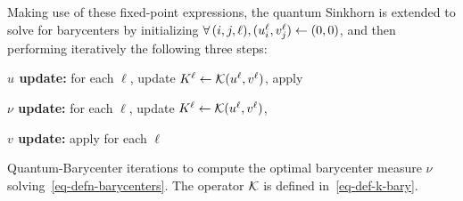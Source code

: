 Making use of these fixed-point expressions, the quantum Sinkhorn is extended to solve for barycenters by initializing $\forall \, (i,j,\ell), (u_i^\ell,v_j^\ell) \leftarrow (0,0)$, and then performing iteratively the following three steps:
\begin{rs}
	\item \textbf{$u$ update:}  for each $\ell$, update $K^\ell \leftarrow \mathcal{K}(u^\ell,v^\ell)$, apply
	\item \textbf{$\nu$ update:} for each $\ell$, update $K^\ell \leftarrow \mathcal{K}(u^\ell,v^\ell)$, 
	\item \textbf{$v$ update:} apply for each $\ell$
\end{rs}
\fi

\begin{algorithm}[t]
\fbox{\hspace{-.1in}\parbox{\columnwidth}{%
\begin{algorithmic}
\Function{Quantum-Barycenter}{$(\mu_\ell)_{\ell=1}^L,c,\epsilon,\rho$}
	\algspace
	\State Choose $\tau_1 \in ]0,\tfrac{2 \epsilon}{\epsilon+\rho}[$, 
		$\tau_2 \in ]0,2[$.
	\Let{$\foralls (i,j) \in I \times J, \quad (u_i,v_j)$}{$(0_{d \times d}, 0_{d \times d})$}
	\For{$s=1,2,3,\ldots$.}
		\For{$\ell=1,\ldots,L$}
			\Let{$K^\ell$}{$\Kern(u^\ell,v^\ell)$, }
			\State $\foralls i \in I, \quad u_i^\ell \RelaxAssign{\tau_1} \LSE_j(K_{i,j}^\ell)-\log(\mu_i^\ell)$, 
			\Let{$K^\ell$}{$\Kern(u^\ell,v^\ell)$.}
		\EndFor
		\State $\foralls j \in J, \quad \log(\nu_j) \leftarrow 
			\sum_\ell w_\ell ( \LSE_i(K_{i,j}^\ell) + v^\ell_j/\epsilon ).$
		\For{$\ell=1,\ldots,L$}
			\State $\foralls j \in J, \quad v_j^\ell \RelaxAssign{\tau_2} \epsilon \LSE_i(K_{i,j}^\ell) + v^\ell_j - \epsilon \log(\nu_j).$	
		\EndFor		
	\EndFor
	\State\Return{$\nu$}
\EndFunction
  \end{algorithmic}
}}
\caption{Quantum-Barycenter iterations to compute the optimal barycenter measure $\nu$ solving~\eqref{eq-defn-barycenters}. The operator $\mathcal{K}$ is defined in~\eqref{eq-def-k-bary}. \label{alg:barycenter}}
\end{algorithm}




